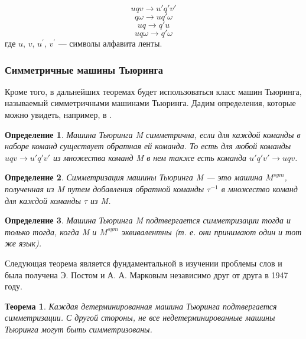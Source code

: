 \documentclass[14pt]{matmex-diploma-custom}
\newtheorem{thm}{Теорема}[subsection]
\newtheorem{defn}{Определение}[subsection]
\begin{document}
\begin{equation}
    u q v \to u' q' v' \label{eqreplace}
\end{equation}
\begin{equation}
    q \omega \to u q' \omega \label{eqinsert}
\end{equation}
\begin{equation}
    u q \to q' u \label{eqmove}
\end{equation}
\begin{equation}
    u q \omega \to q' \omega \label{eqdelete}
\end{equation}
где $u$, $v$, $u^{'}$, $v^{'}$ --- символы алфавита ленты. 

\subsubsection{Симметричные машины Тьюринга}

Кроме того, в дальнейших теоремах будет использоваться класс машин Тьюринга,
называемый симметричными машинами Тьюринга. Дадим определения, которые можно увидеть, 
например, в \cite{symTM}.

\begin{defn}
Машина Тьюринга M симметрична, если для каждой команды в наборе команд существует
обратная ей команда. То есть для любой команды $ u q v \to u' q' v'$ из множества команд 
M в нем также есть команда $ u' q' v' \to u q v $.
\end{defn}

\begin{defn}
Симметризация машины Тьюринга M --- это машина $M^{sym}$, полученная из M путем добавления обратной 
команды $\tau^{-1}$ в множество команд для каждой команды $\tau$ из M.
\end{defn}

\begin{defn}
Машина Тьюринга M подтвергается симметризации тогда и только тогда, 
когда M и $M^{sym}$ эквивалентны (т. е. они принимают один и тот же язык).
\end{defn}

Следующая теорема является фундаментальной в изучении проблемы слов и была получена 
Э. Постом и А. А. Марковым независимо друг от друга в 1947 году.

\begin{thm} \label{symDetTm}
Каждая детерминированная машина Тьюринга подтвергается симметризации. 
С другой стороны, не все недетерминированные машины Тьюринга могут быть симметризованы.
\end{thm}
\end{document}
